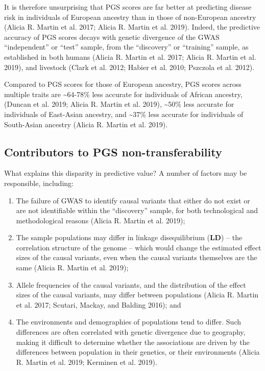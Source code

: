 \documentclass[
]{book}
\begin{document}
It is therefore unsurprising that PGS scores are far better at predicting disease risk in individuals of European ancestry than in those of non-European ancestry (Alicia R. Martin et al. 2017; Alicia R. Martin et al. 2019). Indeed, the predictive accuracy of PGS scores decays with genetic divergence of the GWAS ``independent'' or ``test'' sample, from the ``discovery'' or ``training'' sample, as established in both humans (Alicia R. Martin et al. 2017; Alicia R. Martin et al. 2019), and livestock (Clark et al. 2012; Habier et al. 2010; Pszczola et al. 2012).

Compared to PGS scores for those of European ancestry, PGS scores across multiple traits are \textasciitilde64-78\% less accurate for individuals of African ancestry, (Duncan et al. 2019; Alicia R. Martin et al. 2019), \textasciitilde50\% less accurate for individuals of East-Asian ancestry, and \textasciitilde37\% less accurate for individuals of South-Asian ancestry (Alicia R. Martin et al. 2019).

\hypertarget{contributors-to-pgs-non-transferability}{%
\subsection{Contributors to PGS non-transferability}\label{contributors-to-pgs-non-transferability}}

What explains this disparity in predictive value? A number of factors may be responsible, including:

\begin{enumerate}
\def\labelenumi{\arabic{enumi}.}
\item
  The failure of GWAS to identify causal variants that either do not exist or are not identifiable within the ``discovery'' sample, for both technological and methodological reasons (Alicia R. Martin et al. 2019);
\item
  The sample populations may differ in linkage disequilibrium (\textbf{LD}) -- the correlation structure of the genome -- which would change the estimated effect sizes of the causal variants, even when the causal variants themselves are the same (Alicia R. Martin et al. 2019);
\item
  Allele frequencies of the causal variants, and the distribution of the effect sizes of the causal variants, may differ between populations (Alicia R. Martin et al. 2017; Scutari, Mackay, and Balding 2016); and
\item
  The environments and demographies of populations tend to differ. Such differences are often correlated with genetic divergence due to geography, making it difficult to determine whether the associations are driven by the differences between population in their genetics, or their environments (Alicia R. Martin et al. 2019; Kerminen et al. 2019).
\end{enumerate}
\end{document}

